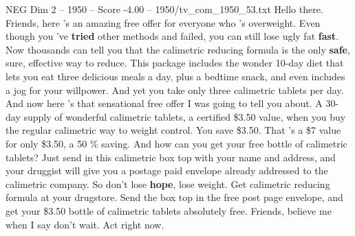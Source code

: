 \begin{textsample}{NEG Dim 2 – 1950 – Score -4.00 – 1950/tv\_com\_1950\_53.txt}  \label{ex:f2_neg_083}
Hello there.
Friends, here 's an amazing free offer for everyone who 's overweight.
Even though you 've \textbf{tried} other methods and failed, you can still lose ugly fat \textbf{fast}.
Now thousands can tell you that the calimetric reducing formula is the only \textbf{safe}, sure, effective way to reduce.
This package includes the wonder 10-day diet that lets you eat three delicious meals a day, plus a bedtime snack, and even includes a jog for your willpower.
And yet you take only three calimetric tablets per day.
And now here 's that sensational free offer I was going to tell you about.
A 30-day supply of wonderful calimetric tablets, a certified \$3.50 value, when you buy the regular calimetric way to weight control.
You save \$3.50.
That 's a \$7 value for only \$3.50, a 50 \% saving.
And how can you get your free bottle of calimetric tablets?
Just send in this calimetric box top with your name and address, and your druggist will give you a postage paid envelope already addressed to the calimetric company.
So don't lose \textbf{hope}, lose weight.
Get calimetric reducing formula at your drugstore.
Send the box top in the free post page envelope, and get your \$3.50 bottle of calimetric tablets absolutely free.
Friends, believe me when I say don't wait.
Act right now.

\end{textsample}
